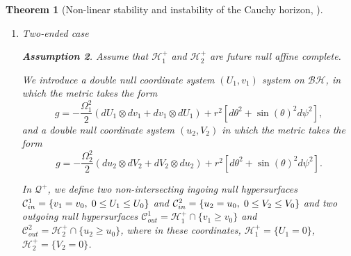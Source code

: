 \documentclass[10pt,a4paper]{article}
\theoremstyle{plain}
\newtheorem{thm}{Theorem}[section]
\theoremstyle{remark}
\theoremstyle{definition}
\newtheorem{hyp}{Assumption}
\theoremstyle{plain}
\theoremstyle{remark}
\theoremstyle{definition}
\numberwithin{equation}{section}
\begin{document}
\begin{thm}[Non-linear stability and instability of the Cauchy horizon, \cite{Moi}]
\begin{enumerate}
		
		
		If we also make a lower bound assumption on $\phi$, we obtain also an instability result on the Ricci curvature: \begin{hyp} 
			Assume that for some $2s-1 \leq p \leq  \max \{2s, 6s-3\}$, and some $D>0$, the following lower bound holds \begin{equation} \label{lowerhyp}
			\int_v^{+\infty}|D_{v} \phi|_{|\mathcal{H}^+}^2(v')dv' \geq D \cdot v^{-p}.
			\end{equation} 
		\end{hyp}
		
		Then, under this additional assumption, \eqref{phiVLBlowerbound} holds, and moreover, defining the outgoing radial geodesic vector field $V= \Omega^{-2} \partial_v$, we have, for every $0<U \leq U_s $: $$ \limsup_{v \rightarrow+\infty} Ric(V,V)(U,v)=+\infty. $$
		
		
		\item  Two-ended case
		
		
		\begin{hyp}
			Assume that $\mathcal{H}^+_1$ and $\mathcal{H}^+_2$ are future null affine complete.
		\end{hyp}
		
		We introduce a double null coordinate system $(U_1,v_1)$ system on $\mathcal{BH}$, in which the metric takes the form $$ g =  - \frac{\Omega^{2}_1}{2} (dU_1  \otimes dv_1+dv_1  \otimes dU_1)+r^{2}[ d\theta^{2}+\sin(\theta)^{2}d \psi^{2}],$$ and a double null coordinate system $(u_2,V_2)$ in which the metric takes the form $$ g =  - \frac{\Omega^{2}_2}{2} (du_2  \otimes dV_2+dV_2  \otimes du_2)+r^{2}[ d\theta^{2}+\sin(\theta)^{2}d \psi^{2}].$$ 
		
		In $\mathcal{Q}^+$, we define two non-intersecting ingoing null hypersurfaces $\mathcal{C}_{in}^1= \{ v_1=v_{0}, \hskip 1 mm 0 \leq U_1 \leq U_0\}$ and $\mathcal{C}_{in}^2= \{ u_2=u_0, \hskip 1 mm 0 \leq V_2 \leq V_0\}$ and two outgoing null hypersurfaces $ \mathcal{C}_{out}^1=\mathcal{H}^+_1 \cap  \{v_1 \geq v_0\}$ and $ \mathcal{C}_{out}^2=\mathcal{H}^+_2 \cap  \{u_2 \geq u_0\}$, where in these coordinates, $\mathcal{H}^+_1= \{ U_1=0\}$, $\mathcal{H}^+_2= \{ V_2=0\}$.
		

\end{enumerate}
\end{thm}
\end{document}
